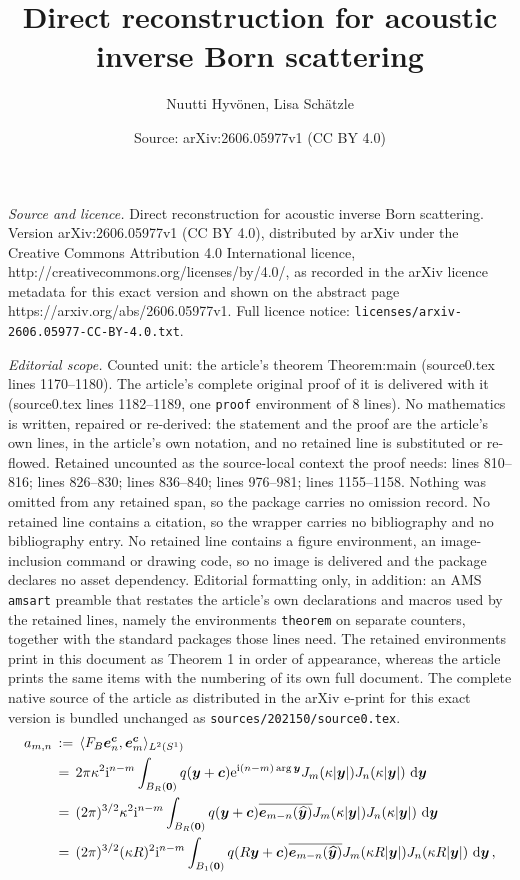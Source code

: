 \documentclass[10pt,a4paper]{amsart}
\title{Direct reconstruction for acoustic inverse Born scattering}
\author{Nuutti Hyv\"onen, Lisa Sch\"atzle}
\date{Source: arXiv:2606.05977v1 (CC BY 4.0)}
\newcommand{\Sone}{{S^1}}
\newcommand{\bfc}{{\bs c}}
\newcommand{\bfe}{{\bs e}}
\newcommand{\bfy}{{\bs y}}
\newcommand{\bfzero}{{\bs 0}}
\newcommand{\bs}{\boldsymbol}
\DeclareMathOperator{\dif}{d\!}
\newcommand{\dy}{\, \dif \bfy}
\newcommand{\rme}{\mathrm{e}}
\newcommand{\rmi}{\mathrm{i}}
\newcommand{\yhat}{\widehat{\bfy}}
\begin{document}
\maketitle

\noindent\emph{Source and licence.} Direct reconstruction for acoustic inverse Born scattering. Version arXiv:2606.05977v1 (CC BY 4.0), distributed by arXiv under the Creative Commons Attribution 4.0 International licence, http://creativecommons.org/licenses/by/4.0/, as recorded in the arXiv licence metadata for this exact version and shown on the abstract page https://arxiv.org/abs/2606.05977v1. Full licence notice: \texttt{licenses/arxiv-2606.05977-CC-BY-4.0.txt}.\par\smallskip

\noindent\textit{Editorial scope.} Counted unit: the article's theorem Theorem:main (source0.tex lines 1170--1180). The article's complete original proof of it is delivered with it (source0.tex lines 1182--1189, one \texttt{proof} environment of 8 lines). No mathematics is written, repaired or re-derived: the statement and the proof are the article's own lines, in the article's own notation, and no retained line is substituted or re-flowed.  Retained uncounted as the source-local context the proof needs: lines 810--816; lines 826--830; lines 836--840; lines 976--981; lines 1155--1158.  Nothing was omitted from any retained span, so the package carries no omission record.  No retained line contains a citation, so the wrapper carries no bibliography and no bibliography entry.  No retained line contains a figure environment, an image-inclusion command or drawing code, so no image is delivered and the package declares no asset dependency.  Editorial formatting only, in addition: an AMS \texttt{amsart} preamble that restates the article's own declarations and macros used by the retained lines, namely the environments \texttt{theorem} on separate counters, together with the standard packages those lines need.  The retained environments print in this document as Theorem 1 in order of appearance, whereas the article prints the same items with the numbering of its own full document.  The complete native source of the article as distributed in the arXiv e-print for this exact version is bundled unchanged as \texttt{sources/202150/source0.tex}.
\begin{align}
	a_{m,n} &\,:=\, \langle F_B\bfe^\bfc_n,\bfe^\bfc_m\rangle_{L^2(\Sone)} \notag\\
    &\,=\, 2\pi \kappa^2\rmi^{n-m} \int_{B_R(\bfzero)} q(\bfy+\bfc)\rme^{\rmi(n-m)\arg\bfy}J_m(\kappa|\bfy|)J_n(\kappa|\bfy|)\dy \notag\\
	&\,=\, (2\pi)^{3/2} \kappa^2\rmi^{n-m} \int_{B_R(\bfzero)} q(\bfy+\bfc)\overline{\bfe_{m-n}(\yhat)}J_m(\kappa|\bfy|)J_n(\kappa|\bfy|)\dy \notag\\
    &\,=\, (2\pi)^{3/2} (\kappa R)^2\rmi^{n-m} \int_{B_1(\bfzero)} q(R\bfy+\bfc)\overline{\bfe_{m-n}(\yhat)}J_m(\kappa R|\bfy|)J_n(\kappa R|\bfy|)\dy \,,
    \label{eq:exp_coeff_FF}
\end{align}
\end{document}
